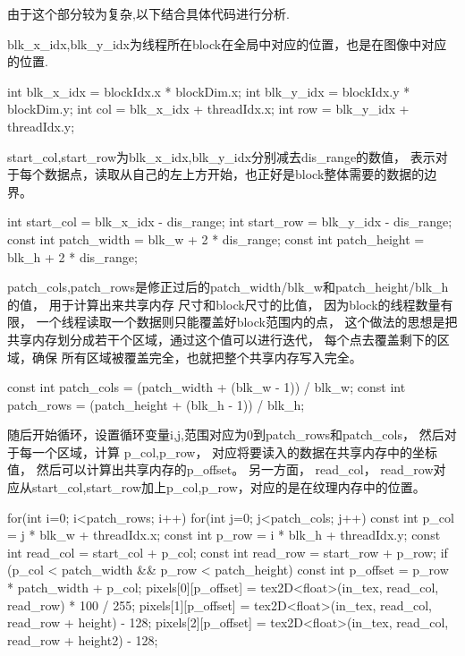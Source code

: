 \documentclass[a4paper, 11pt]{article}
\begin{document}
由于这个部分较为复杂,以下结合具体代码进行分析.

blk\_x\_idx,blk\_y\_idx为线程所在block在全局中对应的位置，也是在图像中对应的位置.

\begin{CPP}
    int blk_x_idx = blockIdx.x * blockDim.x;
    int blk_y_idx = blockIdx.y * blockDim.y;
    int col = blk_x_idx + threadIdx.x;
    int row = blk_y_idx + threadIdx.y;
\end{CPP}

start\_col,start\_row为blk\_x\_idx,blk\_y\_idx分别减去dis\_range的数值，
表示对于每个数据点，读取从自己的左上方开始，也正好是block整体需要的数据的边界。
\begin{CPP}
    int start_col = blk_x_idx - dis_range;
    int start_row = blk_y_idx - dis_range;
    const int patch_width = blk_w + 2 * dis_range;
    const int patch_height = blk_h + 2 * dis_range;
\end{CPP}

 patch\_cols,patch\_rows是修正过后的patch\_width/blk\_w和patch\_height/blk\_h的值，
 用于计算出来共享内存 尺寸和block尺寸的比值，
 因为block的线程数量有限，
 一个线程读取一个数据则只能覆盖好block范围内的点， 
 这个做法的思想是把共享内存划分成若干个区域，通过这个值可以进行迭代，
 每个点去覆盖剩下的区域，确保 所有区域被覆盖完全，也就把整个共享内存写入完全。

\begin{CPP}
    const int patch_cols = (patch_width + (blk_w - 1)) / blk_w;
    const int patch_rows = (patch_height + (blk_h - 1)) / blk_h;
\end{CPP}

随后开始循环，设置循环变量i,j,范围对应为0到patch\_rows和patch\_cols，
然后对于每一个区域，计算 p\_col,p\_row，
对应将要读入的数据在共享内存中的坐标值，
然后可以计算出共享内存的p\_oﬀset。
另一方面， read\_col，
read\_row对应从start\_col,start\_row加上p\_col,p\_row，对应的是在纹理内存中的位置。

\begin{CPP}
    for(int i=0; i<patch_rows; i++) {
        for(int j=0; j<patch_cols; j++) {
            const int p_col = j * blk_w + threadIdx.x;
            const int p_row = i * blk_h + threadIdx.y;
            const int read_col = start_col + p_col;
            const int read_row = start_row + p_row;
            if (p_col < patch_width && p_row < patch_height) {
                const int p_offset = p_row * patch_width + p_col;
                pixels[0][p_offset] = tex2D<float>(in_tex, read_col, read_row) * 100 / 255;
                pixels[1][p_offset] = tex2D<float>(in_tex, read_col, read_row + height) - 128;
                pixels[2][p_offset] = tex2D<float>(in_tex, read_col, read_row + height2) - 128;
            }
        }
    }
\end{CPP}
\end{document}

